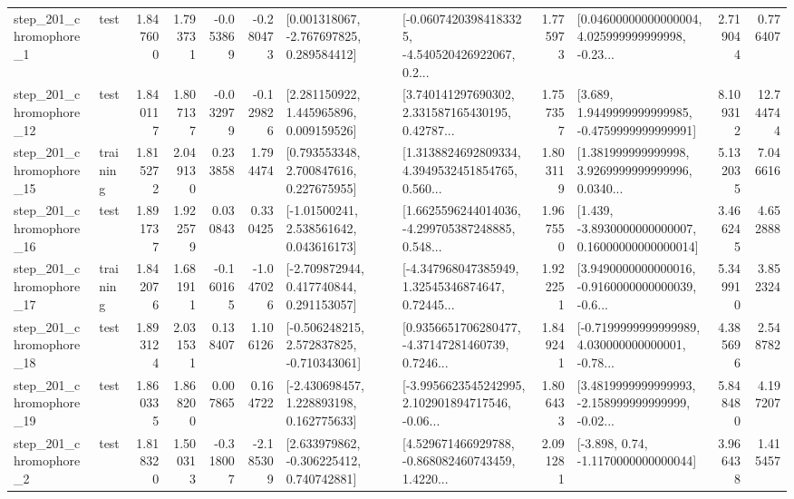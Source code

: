 \begin{tabular}{llrrrrllrlrr}
   step\_201\_chromophore\_1 &      test &      1.847600 &    1.793731 &     -0.053869 & -0.280473 &    [0.001318067, -2.767697825, 0.289584412] &  [-0.06074203984183325, -4.540520426922067, 0.2... &       1.775973 &  [0.04600000000000004, 4.025999999999998, -0.23... &            2.719044 &          0.776407 \\
  step\_201\_chromophore\_12 &      test &      1.840117 &    1.807137 &     -0.032979 & -0.129826 &     [2.281150922, 1.445965896, 0.009159526] &  [3.740141297690302, 2.331587165430195, 0.42787... &       1.757357 &   [3.689, 1.9449999999999985, -0.4759999999999991] &            8.109312 &         12.744744 \\
  step\_201\_chromophore\_15 &  training &      1.815272 &    2.049130 &      0.233858 &  1.794474 &     [0.793553348, 2.700847616, 0.227675955] &  [1.3138824692809334, 4.3949532451854765, 0.560... &       1.803119 &  [1.381999999999998, 3.9269999999999996, 0.0340... &            5.132035 &          7.046616 \\
  step\_201\_chromophore\_16 &      test &      1.891737 &    1.922579 &      0.030843 &  0.330425 &     [-1.01500241, 2.538561642, 0.043616173] &  [1.6625596244014036, -4.299705387248885, 0.548... &       1.967550 &  [1.439, -3.8930000000000007, 0.16000000000000014] &            3.466245 &          4.652888 \\
  step\_201\_chromophore\_17 &  training &      1.842076 &    1.681911 &     -0.160165 & -1.047026 &    [-2.709872944, 0.417740844, 0.291153057] &  [-4.347968047385949, 1.32545346874647, 0.72445... &       1.922251 &  [3.9490000000000016, -0.9160000000000039, -0.6... &            5.349910 &          3.852324 \\
  step\_201\_chromophore\_18 &      test &      1.893124 &    2.031531 &      0.138407 &  1.106126 &   [-0.506248215, 2.572837825, -0.710343061] &  [0.9356651706280477, -4.37147281460739, 0.7246... &       1.849241 &  [-0.7199999999999989, 4.030000000000001, -0.78... &            4.385696 &          2.548782 \\
  step\_201\_chromophore\_19 &      test &      1.860335 &    1.868200 &      0.007865 &  0.164722 &    [-2.430698457, 1.228893198, 0.162775633] &  [-3.9956623545242995, 2.102901894717546, -0.06... &       1.806433 &  [3.4819999999999993, -2.158999999999999, -0.02... &            5.848480 &          4.197207 \\
   step\_201\_chromophore\_2 &      test &      1.818320 &    1.500313 &     -0.318007 & -2.185309 &    [2.633979862, -0.306225412, 0.740742881] &  [4.529671466929788, -0.868082460743459, 1.4220... &       2.091281 &                [-3.898, 0.74, -1.1170000000000044] &            3.966438 &          1.415457 \\

\end{tabular}
